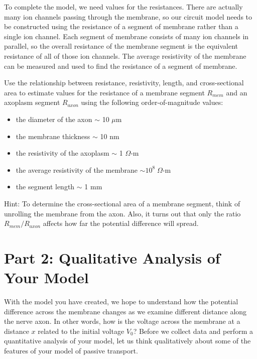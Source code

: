 \par 
To complete the model, we need values for the resistances.
There are actually many ion channels passing through the membrane, so our circuit model needs to be constructed using the resistance of a segment of membrane rather  than a single ion channel.
Each segment of membrane consists of many ion channels in parallel, so the overall resistance of the membrane segment is the equivalent resistance of all of those ion channels. 
The average resistivity of the membrane can be measured and used to find the resistance of a segment of membrane.
\par 
Use the relationship between resistance, resistivity, length, and cross-sectional area to estimate values for the resistance of a membrane segment $R_{mem}$ and an axoplasm segment $R_{axon}$ using the following order-of-magnitude values:
\begin{itemize}
\item the diameter of the axon $\sim$ 10 $\mu$m
\item the membrane thickness $\sim$ 10 nm
\item the resistivity of the axoplasm $\sim$ 1 $\Omega$-m
\item the average resistivity of the membrane $\sim  10^{8} \; \Omega$-m
\item the segment length $\sim$ 1 mm
\end{itemize}
Hint: To determine the cross-sectional area of a membrane segment, think of unrolling the membrane from the axon.
Also, it turns out that only the ratio $R_{mem}/R_{axon}$ affects how far the potential difference will spread.

\section*{Part 2: Qualitative Analysis of Your Model}
With the model you have created, we hope to understand how the potential difference across the membrane changes as we examine different distance along the nerve axon.
In other words, how is the voltage across the membrane at a distance $x$ related to the initial voltage $V_{0}$?
Before we collect data and perform a quantitative analysis of your model, let us think qualitatively about some of the features of your model of passive transport.
\par 
